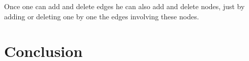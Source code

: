 \documentclass[a4paper,11pt]{article}
\begin{document}
Once one can add and delete edges he can also add and delete nodes, just by adding or deleting one by one the edges involving these nodes.


\section*{Conclusion}





{}


\end{document}
